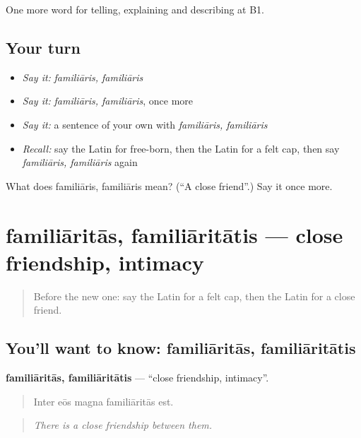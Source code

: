 \begin{grammarlens}[title={What you've built}]
One more word for telling, explaining and describing at B1.
\end{grammarlens}

\subsection*{Your turn}
\begin{itemize}
\raggedright
  \item \emph{Say it:} \emph{familiāris, familiāris}
  \item \emph{Say it:} \emph{familiāris, familiāris}, once more
  \item \emph{Say it:} a sentence of your own with \emph{familiāris, familiāris}
  \item \emph{Recall:} say the Latin for free-born, then the Latin for a felt cap, then say \emph{familiāris, familiāris} again
\end{itemize}

\begin{tcolorbox}[breakable,colback=teal!4,colframe=teal!35!black,title={Before you move on}]
What does familiāris, familiāris mean? (\textquotedblleft{}A close friend\textquotedblright{}.) Say it once more.
\end{tcolorbox}
\section[familiāritās, familiāritātis]{familiāritās, familiāritātis — close friendship, intimacy}

\label{lesson:LA-C533-familiaritas}



\begin{quote}
Before the new one: say the Latin for a felt cap, then the Latin for a close friend.
\end{quote}

\subsection*{You'll want to know: familiāritās, familiāritātis}
\textbf{familiāritās, familiāritātis} — \textquotedblleft{}close friendship, intimacy\textquotedblright{}.

\begin{quote}
Inter eōs magna familiāritās est.
\end{quote}

\begin{quote}
\emph{There is a close friendship between them.}
\end{quote}

